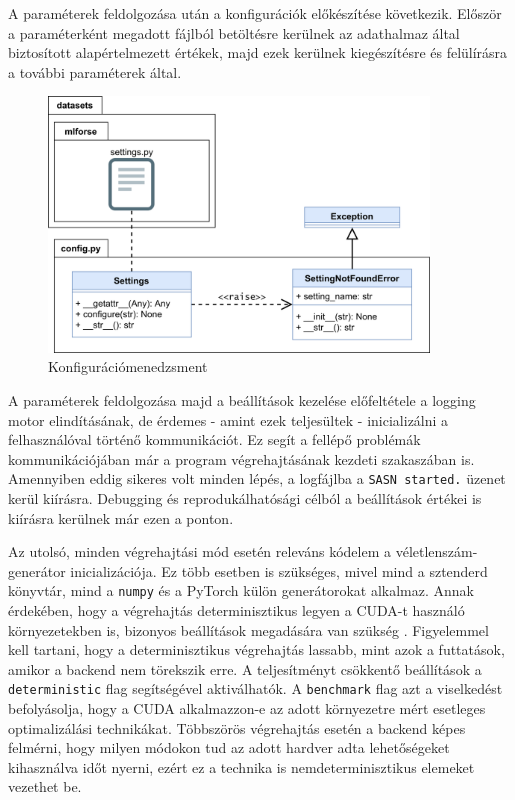 \documentclass[twoside, 12pt]{report}
\newcommand{\graphicswidth}{0.9\textwidth}
\begin{document}
A paraméterek feldolgozása után a konfigurációk előkészítése következik. Először a paraméterként megadott fájlból betöltésre kerülnek az adathalmaz által biztosított alapértelmezett értékek, majd ezek kerülnek kiegészítésre és felülírásra a további paraméterek által.

\begin{figure}[H]
  \centering
  \includegraphics[width=\graphicswidth]{osztaly-diagram-konfiguracio.png}
  \caption{Konfigurációmenedzsment}
\end{figure}

A paraméterek feldolgozása majd a beállítások kezelése előfeltétele a logging motor elindításának, de érdemes - amint ezek teljesültek - inicializálni a felhasználóval történő kommunikációt. Ez segít a fellépő problémák kommunikációjában már a program végrehajtásának kezdeti szakaszában is. Amennyiben eddig sikeres volt minden lépés, a logfájlba a \verb|SASN started.| üzenet kerül kiírásra. Debugging és reprodukálhatósági célból a beállítások értékei is kiírásra kerülnek már ezen a ponton.

Az utolsó, minden végrehajtási mód esetén releváns kódelem a véletlenszám-generátor inicializációja. Ez több esetben is szükséges, mivel mind a sztenderd könyvtár, mind a \verb|numpy| és a PyTorch külön generátorokat alkalmaz. Annak érdekében, hogy a végrehajtás determinisztikus legyen a CUDA-t használó környezetekben is, bizonyos beállítások megadására van szükség \parencite{Tora}. Figyelemmel kell tartani, hogy a determinisztikus végrehajtás lassabb, mint azok a futtatások, amikor a backend nem törekszik erre. A teljesítményt csökkentő beállítások a \verb|deterministic| flag segítségével aktiválhatók. A \verb|benchmark| flag azt a viselkedést befolyásolja, hogy a CUDA alkalmazzon-e az adott környezetre mért esetleges optimalizálási technikákat. Többszörös végrehajtás esetén a backend képes felmérni, hogy milyen módokon tud az adott hardver adta lehetőségeket kihasználva időt nyerni, ezért ez a technika is nemdeterminisztikus elemeket vezethet be.
\end{document}
